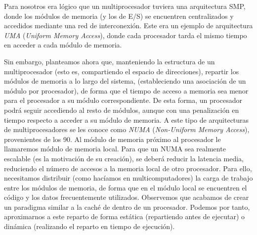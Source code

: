 Para nosotros era lógico que un multiprocesador tuviera una arquitectura SMP, donde los módulos de memoria (y los de E/S) se encuentren centralizados y accedidos mediante una red de interconexión. Este era un ejemplo de arquitectura \emph{UMA} (\emph{Uniform Memory Access}), donde cada procesador tarda el mismo tiempo en acceder a cada módulo de memoria.

Sin embargo, planteamos ahora que, manteniendo la estructura de un multiprocesador (esto es, compartiendo el espacio de direcciones), repartir los módulos de memoria a lo largo del sistema, (estableciendo una asociación de un módulo por procesador), de forma que el tiempo de acceso a memoria sea menor para el procesador a su módulo correspondiente. De esta forma, un procesador podrá seguir accediendo al resto de módulos, aunque con una penalización en tiempo respecto a acceder a su módulo de memoria. A este tipo de arquitecturas de multiprocesadores se les conoce como \emph{NUMA} (\emph{Non-Uniform Memory Access}), provenientes de los 90. Al módulo de memoria próximo al procesador le llamaremos módulo de memoria local. Para que un NUMA sea realmente escalable (es la motivación de su creación), se deberá reducir la latencia media, reduciendo el número de accesos a la memoria local de otro procesador. Para ello, necesitamos distribuir (como hacíamos en multicomputadores) la carga de trabajo entre los módulos de memoria, de forma que en el módulo local se encuentren el código y los datos frecuentemente utilizados. Observemos que acabamos de crear un paradigma similar a la caché de dentro de un procesador. Podemos por tanto, aproximarnos a este reparto de forma estática (repartiendo antes de ejecutar) o dinámica (realizando el reparto en tiempo de ejecución).

